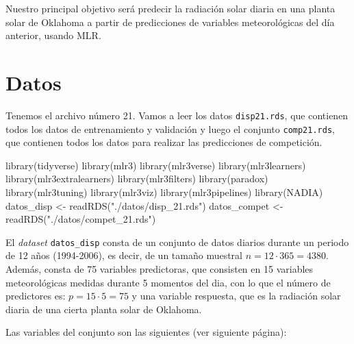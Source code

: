 \documentclass[
  11pt,
  a4paper,
]{article}
\newenvironment{Shaded}{\begin{snugshade}}{\end{snugshade}}
\newcommand{\FunctionTok}[1]{\textcolor[rgb]{0.00,0.00,0.00}{#1}}
\newcommand{\NormalTok}[1]{#1}
\newcommand{\OtherTok}[1]{\textcolor[rgb]{0.56,0.35,0.01}{#1}}
\newcommand{\StringTok}[1]{\textcolor[rgb]{0.31,0.60,0.02}{#1}}
\begin{document}
Nuestro principal objetivo será predecir la radiación solar diaria en
una planta solar de Oklahoma a partir de predicciones de variables
meteorológicas del día anterior, usando MLR.

\section{Datos}

Tenemos el archivo número 21. Vamos a leer los datos
\texttt{disp21.rds}, que contienen todos los datos de entrenamiento y
validación y luego el conjunto \texttt{comp21.rds}, que contienen todos
los datos para realizar las predicciones de competición.

\begin{Shaded}
\begin{Highlighting}[]
\FunctionTok{library}\NormalTok{(tidyverse)}
\FunctionTok{library}\NormalTok{(mlr3)}
\FunctionTok{library}\NormalTok{(mlr3verse)}
\FunctionTok{library}\NormalTok{(mlr3learners)}
\FunctionTok{library}\NormalTok{(mlr3extralearners)}
\FunctionTok{library}\NormalTok{(mlr3filters)}
\FunctionTok{library}\NormalTok{(paradox)}
\FunctionTok{library}\NormalTok{(mlr3tuning)}
\FunctionTok{library}\NormalTok{(mlr3viz)}
\FunctionTok{library}\NormalTok{(mlr3pipelines)}
\FunctionTok{library}\NormalTok{(NADIA)}
\NormalTok{datos\_disp }\OtherTok{\textless{}{-}} \FunctionTok{readRDS}\NormalTok{(}\StringTok{"./datos/disp\_21.rds"}\NormalTok{)}
\NormalTok{datos\_compet }\OtherTok{\textless{}{-}} \FunctionTok{readRDS}\NormalTok{(}\StringTok{"./datos/compet\_21.rds"}\NormalTok{)}
\end{Highlighting}
\end{Shaded}

El \emph{dataset} \texttt{datos\_disp} consta de un conjunto de datos
diarios durante un periodo de 12 años (1994-2006), es decir, de un
tamaño muestral \(n = 12 \cdot 365 = 4380\). Además, consta de 75
variables predictoras, que consisten en 15 variables meteorológicas
medidas durante 5 momentos del dia, con lo que el número de predictores
es: \(p = 15 \cdot 5 = 75\) y una variable respuesta, que es la
radiación solar diaria de una cierta planta solar de Oklahoma.

Las variables del conjunto son las siguientes (ver siguiente página):
\clearpage
\end{document}
